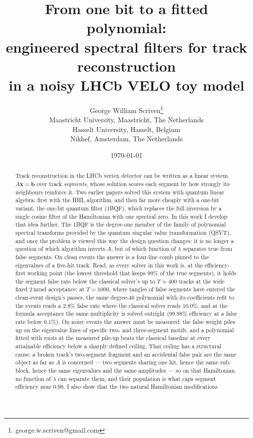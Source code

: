 \documentclass[11pt,a4paper]{article}
\title{From one bit to a fitted polynomial:\\
engineered spectral filters for track reconstruction\\
in a noisy LHCb VELO toy model}
\author{George William Scriven\thanks{george.w.scriven@gmail.com}\\[2pt]
\normalsize Maastricht University, Maastricht, The Netherlands\\
\normalsize Hasselt University, Hasselt, Belgium\\
\normalsize Nikhef, Amsterdam, The Netherlands}
\date{\today}
\begin{document}
\maketitle

\begin{abstract}
Track reconstruction in the LHCb vertex detector can be written as a linear
system $A\mathbf{x}=\mathbf{b}$ over track \emph{segments}, whose solution
scores each segment by how strongly its neighbours reinforce it. Two earlier
papers solved this system with quantum linear algebra: first with the HHL
algorithm, and then far more cheaply with a one-bit variant, the one-bit
quantum filter (1BQF), which replaces the full inversion by a single cosine
filter of the Hamiltonian with one spectral zero. In this work I develop
that idea further. The 1BQF is the degree-one member of the family of
polynomial spectral transforms provided by the quantum singular value
transformation (QSVT), and once the problem is viewed this way the design
question changes: it is no longer a question of which algorithm inverts
$A$, but of which function of $\lambda$ separates true from false segments.
On clean events the answer is a four-line comb pinned to the eigenvalues of
a five-hit track. Read, as every solver in this work is, at the
efficiency-first working point (the lowest threshold that keeps $99\%$ of
the true segments), it holds the segment false rate below the classical
solver's up to $T\approx400$ tracks at the wide fixed $2$\,mrad acceptance;
at $T{=}1000$, where tangles of false segments have entered the clean-event
design's passes, the same degree-40 polynomial with its coefficients refit
to the events reads a $2.8\%$ false rate where the classical solver reads
$10.0\%$, and at the formula acceptance the same multiplicity is solved
outright ($99.98\%$ efficiency at a false rate below $0.1\%$). On noisy
events the answer must be measured: the false weight piles up on the
eigenvalue lines of specific two- and three-segment motifs, and a
polynomial fitted with roots at the measured pile-up beats the classical
baseline at every attainable efficiency below a sharply defined
ceiling. That ceiling has a structural cause: a broken track's
two-segment fragment and an accidental false pair are the same object
as far as $A$ is concerned --- two segments sharing one hit, hence the
same sub-block, hence the same eigenvalues and the same amplitudes ---
so on that Hamiltonian no function of $\lambda$ can separate them, and
their population is what caps segment efficiency near $0.98$. I also show that the two natural Hamiltonian modifications

\end{abstract}
\end{document}
